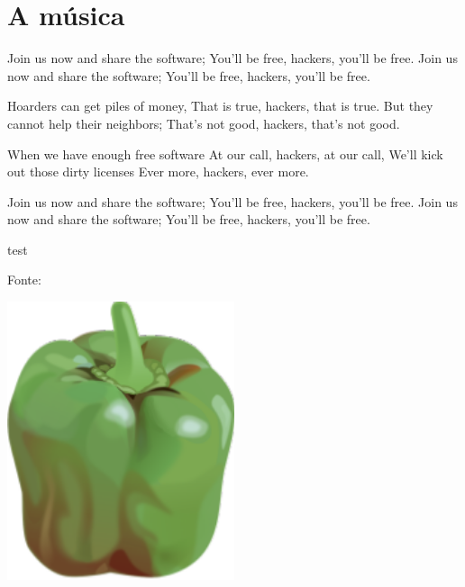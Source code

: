 \documentclass[a4paper, 11pt]{article}
\begin{document}


\tableofcontents

\section{A música}
Join us now and share the software;
You'll be free, hackers, you'll be free.
Join us now and share the software;
You'll be free, hackers, you'll be free.

Hoarders can get piles of money,
That is true, hackers, that is true.
But they cannot help their neighbors;
That's not good, hackers, that's not good.

When we have enough free software
At our call, hackers, at our call,
We'll kick out those dirty licenses
Ever more, hackers, ever more.

Join us now and share the software;
You'll be free, hackers, you'll be free.
Join us now and share the software;
You'll be free, hackers, you'll be free.

test

Fonte: \cite{fsf-song}

\begin{center}
	\includegraphics[width=0.5\textwidth]{pepper.png}
\end{center}

\printbibliography[heading=bibintoc, title=Referências]
\end{document}
